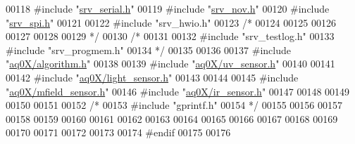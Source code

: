 \begin{DoxyCode}
00118 \textcolor{preprocessor}{#include "\hyperlink{a00031}{srv\_serial.h}"}
00119 \textcolor{preprocessor}{#include "\hyperlink{a00029}{srv\_nov.h}"}
00120 \textcolor{preprocessor}{#include "\hyperlink{a00013}{srv\_spi.h}"}
00121 
00122 \textcolor{preprocessor}{#include "srv\_hwio.h"}
00123 \textcolor{comment}{/*}
00124 \textcolor{comment}{}
00125 \textcolor{comment}{}
00126 \textcolor{comment}{}
00127 \textcolor{comment}{}
00128 \textcolor{comment}{}
00129 \textcolor{comment}{*/}
00130 \textcolor{comment}{/*}
00131 \textcolor{comment}{}
00132 \textcolor{comment}{#include "srv\_testlog.h"}
00133 \textcolor{comment}{#include "srv\_progmem.h"}
00134 \textcolor{comment}{*/}
00135 
00136 
00137 \textcolor{preprocessor}{#include "\hyperlink{a00021}{aq0X/algorithm.h}"}
00138 
00139 \textcolor{preprocessor}{#include "\hyperlink{a00020}{aq0X/uv\_sensor.h}"}
00140 
00141 
00142 \textcolor{preprocessor}{#include "\hyperlink{a00018}{aq0X/light\_sensor.h}"}
00143 
00144 
00145 \textcolor{preprocessor}{#include "\hyperlink{a00019}{aq0X/mfield\_sensor.h}"} 
00146 \textcolor{preprocessor}{#include "\hyperlink{a00017}{aq0X/ir\_sensor.h}"}
00147 
00148 
00149 
00150 
00151 
00152 \textcolor{comment}{/*}
00153 \textcolor{comment}{#include "gprintf.h"}
00154 \textcolor{comment}{*/}
00155 
00156 
00157 
00158 
00159 
00160 
00161 
00162 
00163 
00164 
00165 
00166 
00167 
00168 
00169 
00170 
00171 
00172 
00173 
00174 \textcolor{preprocessor}{#endif}
00175 
00176 
\end{DoxyCode}

